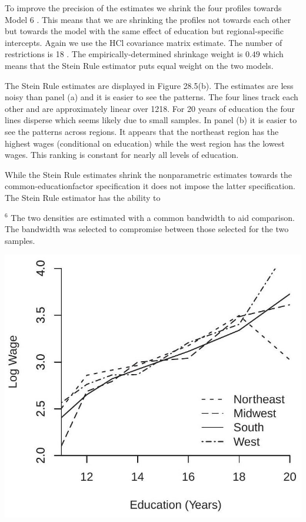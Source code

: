 \documentclass[10pt]{article}
\begin{document}
To improve the precision of the estimates we shrink the four profiles towards Model 6 . This means that we are shrinking the profiles not towards each other but towards the model with the same effect of education but regional-specific intercepts. Again we use the HCl covariance matrix estimate. The number of restrictions is 18 . The empirically-determined shrinkage weight is $0.49$ which means that the Stein Rule estimator puts equal weight on the two models.

The Stein Rule estimates are displayed in Figure 28.5(b). The estimates are less noisy than panel (a) and it is easier to see the patterns. The four lines track each other and are approximately linear over 1218. For 20 years of education the four lines disperse which seems likely due to small samples. In panel (b) it is easier to see the patterns across regions. It appears that the northeast region has the highest wages (conditional on education) while the west region has the lowest wages. This ranking is constant for nearly all levels of education.

While the Stein Rule estimates shrink the nonparametric estimates towards the common-educationfactor specification it does not impose the latter specification. The Stein Rule estimator has the ability to

${ }^{6}$ The two densities are estimated with a common bandwidth to aid comparison. The bandwidth was selected to compromise between those selected for the two samples.

\includegraphics[max width=\textwidth]{2022_10_23_101d59f261a704807a3bg-35}
\end{document}
